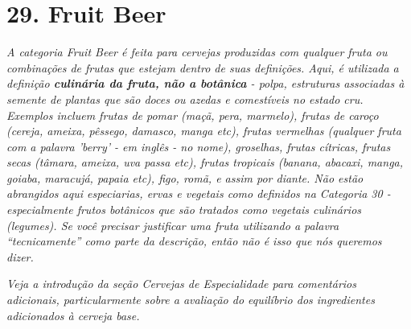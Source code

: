 \section*{29. Fruit Beer}
\textit{A categoria Fruit Beer é feita para cervejas produzidas com qualquer fruta ou combinações de frutas que estejam dentro de suas definições. Aqui, é utilizada a definição \textbf{culinária da fruta, não a botânica} - polpa, estruturas associadas à semente de plantas que são doces ou azedas e comestíveis no estado cru. Exemplos incluem frutas de pomar (maçã, pera, marmelo), frutas de caroço (cereja, ameixa, pêssego, damasco, manga etc), frutas vermelhas (qualquer fruta com a palavra 'berry' - em inglês - no nome), groselhas, frutas cítricas, frutas secas (tâmara, ameixa, uva passa etc), frutas tropicais (banana, abacaxi, manga, goiaba, maracujá, papaia etc), figo, romã, e assim por diante. Não estão abrangidos aqui especiarias, ervas e vegetais como definidos na Categoria 30 - especialmente frutos botânicos que são tratados como vegetais culinários (legumes). Se você precisar justificar uma fruta utilizando a palavra “tecnicamente” como parte da descrição, então não é isso que nós queremos dizer.}

\textit{Veja a introdução da seção Cervejas de Especialidade para comentários adicionais, particularmente sobre a avaliação do equilíbrio dos ingredientes adicionados à cerveja base.}
